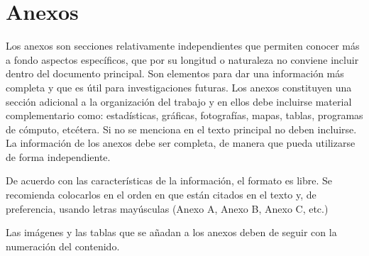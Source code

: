 \anexo{}


\chapter{Anexos} \label{chap:anexA}
Los anexos son secciones relativamente independientes que permiten conocer más a fondo aspectos específicos, que por su longitud o naturaleza no conviene incluir dentro del documento principal. Son elementos para dar una información más completa y que es útil para investigaciones futuras. Los anexos constituyen una sección adicional a la organización del trabajo y en ellos debe incluirse material complementario como: estadísticas, gráficas, fotografías, mapas, tablas, programas de cómputo, etcétera. Si no se menciona en el texto principal no deben incluirse. La información de los anexos debe ser completa, de manera que pueda utilizarse de forma independiente.

De acuerdo con las características de la información, el formato es libre. Se recomienda colocarlos en el orden en que están citados en el texto y, de preferencia, usando letras mayúsculas (Anexo A, Anexo B, Anexo C, etc.)

Las imágenes y las tablas que se añadan a los anexos deben de seguir con la numeración del contenido.  
